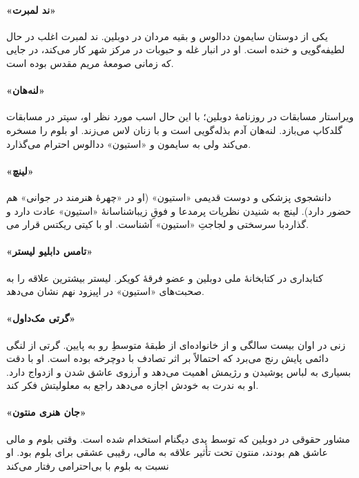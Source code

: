 \documentclass[12pt]{book}
\newcommand{\noun}[1]{«{#1}»}
\begin{document}
    \paragraph{\noun{ند لمبرت}\protect{}}
    یکی از دوستان سایمون ددالوس و بقیه مردان در دوبلین. ند لمبرت اغلب در حال لطیفه‌گویی و خنده است. او در انبار غله و حبوبات در مرکز شهر کار می‌کند، در جایی که زمانی صومعۀ مریم مقدس بوده است.
    \paragraph{\noun{لنه‌هان}\protect{}}
    ویراستار مسابقات در روزنامۀ دوبلین؛ با این حال اسب مورد نظر او، سپتر در مسابقات گلدکاپ می‌بازد. لنه‌هان آدم بذله‌گویی است و با زنان لاس می‌زند. او بلوم را مسخره می‌کند ولی به سایمون و \noun{استیون} ددالوس احترام می‌گذارد.
    \paragraph{\noun{لینچ}\protect{}}
    دانشجوی پزشکی و دوست قدیمی \noun{استیون} (او در «چهرۀ هنرمند در جوانی» هم حضور دارد). لینچ به شنیدن نظریات پرمدعا و فوقِ زیباشناسانۀ \noun{استیون} عادت دارد و با سرسختی و لجاجتِ \noun{استیون} آشناست. او با کیتی ریکتس قرار می‎‌گذارد.
    \paragraph{\noun{تامس دابلیو لیستر}\protect{}}
    کتابداری در کتابخانۀ ملی دوبلین و عضو فرقۀ کویکر. لیستر بیشترین علاقه را به صحبت‌های \noun{استیون} در اپیزود نهم نشان می‌دهد.
    \paragraph{\noun{گرتی مک‌داول}\protect{}}
    زنی در اوان بیست سالگی و از خانواده‌ای از طبقۀ متوسطِ رو به پایین. گرتی از لنگی دائمی پایش رنج می‌برد که احتمالاً بر اثر تصادف با دوچرخه بوده است. او با دقت بسیاری به لباس پوشیدن و رژیمش اهمیت می‌دهد و آرزوی عاشق شدن و ازدواج دارد. او به ندرت به خودش اجازه می‌دهد راجع به معلولیتش فکر کند.
    \paragraph{\noun{جان هنری منتون}\protect{}}
    مشاور حقوقی در دوبلین که توسط پدی دیگنام استخدام شده است. وقتی بلوم و مالی عاشق هم بودند، منتون تحت تأثیر علاقه به مالی، رقیبی عشقی برای بلوم بود. او نسبت به بلوم با بی‌احترامی رفتار می‌کند
\end{document}
